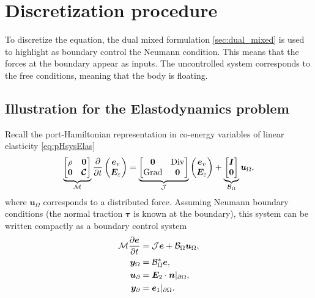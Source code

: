 \section{Discretization procedure}
\label{sec:MB_discr}
To discretize the equation, the dual mixed formulation \ref{sec:dual_mixed} is used to highlight as boundary control the Neumann condition. This means that the forces at the boundary appear as inputs. The uncontrolled system corresponds to the free conditions, meaning that the body is floating.

\subsection{Illustration for the Elastodynamics problem}
Recall the port-Hamiltonian representation in co-energy variables of linear elasticity \ref{eq:pHsysElas}
\begin{equation*}
\underbrace{\begin{bmatrix}
	\rho & \bm{0} \\ \bm{0} & \bm{\mathcal{C}} \\
	\end{bmatrix}}_{\mathcal{M}}
\diffp{}{t}
\begin{pmatrix}
\bm{e}_v \\ \bm{E}_\varepsilon \\
\end{pmatrix} = 
\underbrace{\begin{bmatrix}
	\bm{0} & \Div \\ \Grad & \bm{0} \\
	\end{bmatrix}}_{\mathcal{J}}
\begin{pmatrix}
\bm{e}_v \\ \bm{E}_\varepsilon \\
\end{pmatrix} + 
\underbrace{\begin{bmatrix}
	\bm{I} \\ \bm{0} \\
	\end{bmatrix}}_{\mathcal{B}_\Omega} \bm{u}_\Omega,
\end{equation*}
where $\bm{u}_\Omega$ corresponds to a distributed force. Assuming Neumann boundary conditions (the normal traction $\bm\tau$ is known at the boundary), this system can be written compactly as a boundary control system
\begin{equation}
\label{eq:eldyn_PDE}
\begin{aligned}
\mathcal{M} \diffp{\bm{e}}{t} &= \mathcal{J} \bm{e} + \mathcal{B}_\Omega \bm{u}_\Omega, \\
\bm{y}_\Omega &= \mathcal{B}_\Omega^* \bm{e}, \\
\bm{u}_\partial &= \bm{E}_2 \cdot \bm{n}|_{\partial\Omega}, \\
\bm{y}_\partial &= \bm{e}_1|_{\partial\Omega}.
\end{aligned}
\end{equation}
